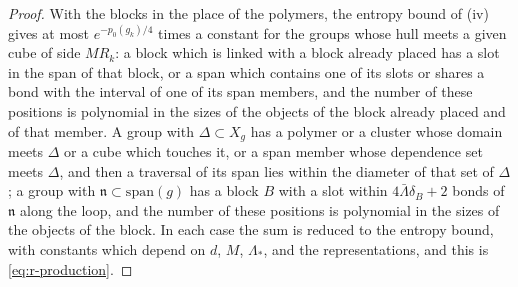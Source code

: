 \documentclass[11pt]{preprint}
\numberwithin{equation}{section}
\theoremstyle{definition}
\theoremstyle{remark}
\theoremstyle{plain}
\begin{document}
\begin{proof}
With the blocks in the place of the polymers, the entropy bound of (iv) gives at most $e^{-p_0(g_k)/4}$ times a constant for the groups whose hull meets a given cube of side $MR_k$: a block which is linked with a block already placed has a slot in the span of that block, or a span which contains one of its slots or shares a bond with the interval of one of its span members, and the number of these positions is polynomial in the sizes of the objects of the block already placed and of that member. A group with $\Delta \subset X_g$ has a polymer or a cluster whose domain meets $\Delta$ or a cube which touches it, or a span member whose dependence set meets $\Delta$, and then a traversal of its span lies within the diameter of that set of $\Delta$; a group with $\mathfrak n \subset \mathrm{span}(g)$ has a block $B$ with a slot within $4\bar\Lambda\delta_B + 2$ bonds of $\mathfrak n$ along the loop, and the number of these positions is polynomial in the sizes of the objects of the block. In each case the sum is reduced to the entropy bound, with constants which depend on $d$, $M$, $\Lambda_*$, and the representations, and this is \eqref{eq:r-production}.


\end{proof}
\end{document}
